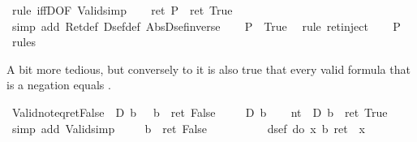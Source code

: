 \begin{isabellebody}
\ {\isacharparenleft}rule\ iffD{}{\isacharbrackleft}OF\ Valid{\isacharunderscore}simp{\isacharbrackright}{\isacharparenright}\isanewline
\ \ \isamarkupfalse%
\ {\isachardoublequote}ret\ P\ {\isacharequal}\ ret\ True{\isachardoublequote}\isanewline
\ \ \ \ \isamarkupfalse%
\ {\isacharparenleft}simp\ add{\isacharcolon}\ Ret{\isacharunderscore}def\ Dsef{\isacharunderscore}def\ Abs{\isacharunderscore}Dsef{\isacharunderscore}inverse{\isacharparenright}\isanewline
\ \ \isamarkupfalse%
\ {\isachardoublequote}P\ {\isacharequal}\ True{\isachardoublequote}\ \isamarkupfalse%
\ {\isacharparenleft}rule\ ret{\isacharunderscore}inject{\isacharparenright}\isanewline
\ \ \isamarkupfalse%
\ {\isachardoublequote}P{\isachardoublequote}\ \isamarkupfalse%
\ rules\isanewline
\isamarkupfalse%
\isamarkupfalse%
%
\begin{isamarkuptext}%
A bit more tedious, but conversely to  it is also true
  that every valid formula that is a negation equals .%
\end{isamarkuptext}%
\isamarkuptrue%
\ Valid{\isacharunderscore}not{\isacharunderscore}eq{\isacharunderscore}ret{\isacharunderscore}False{\isacharcolon}\ {\isachardoublequote}{\isacharparenleft}{\isasymturnstile}\ {\isasymnot}\isactrlsub D\ b{\isacharparenright}\ {\isacharequal}\ {\isacharparenleft}{\isasymDown}\ b\ {\isacharequal}\ ret\ False{\isacharparenright}{\isachardoublequote}\isanewline
\isamarkupfalse%
\isanewline
\ \ \isamarkupfalse%
\ {\isachardoublequote}{\isasymturnstile}\ {\isasymnot}\isactrlsub D\ b{\isachardoublequote}\isanewline
\ \ \isamarkupfalse%
\ nt{\isacharcolon}\ {\isachardoublequote}{\isasymDown}\ {\isacharparenleft}{\isasymnot}\isactrlsub D\ b{\isacharparenright}\ {\isacharequal}\ ret\ True{\isachardoublequote}\ \isamarkupfalse%
\ {\isacharparenleft}simp\ add{\isacharcolon}\ Valid{\isacharunderscore}simp{\isacharparenright}\isanewline
\ \ \isamarkupfalse%
\ {\isachardoublequote}{\isasymDown}\ b\ {\isacharequal}\ ret\ False{\isachardoublequote}\isanewline
\ \ \isamarkupfalse%
\ {\isacharminus}\isanewline
\ \ \ \ \isamarkupfalse%
\ {\isachardoublequote}dsef\ {\isacharparenleft}do\ {\isacharbraceleft}x{\isasymleftarrow}{\isasymDown}\ b{\isacharsemicolon}\ ret\ {\isacharparenleft}{\isasymnot}\ x{\isacharparenright}{\isacharbraceright}{\isacharparenright}{\isachardoublequote}\isanewline

\end{isabellebody}
